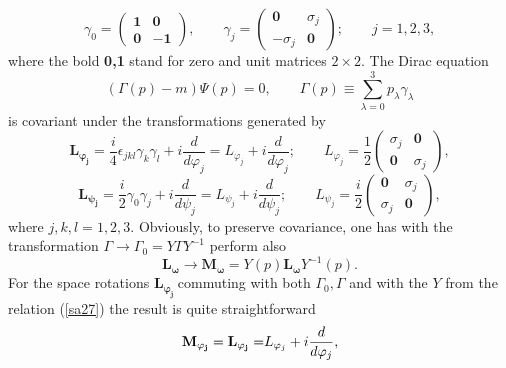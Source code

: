 \documentclass[a4paper,a4paper]{article}
\begin{document}
\begin{equation}
\gamma _{0}=\left( 
\begin{array}{cc}
\mathbf{1} & \mathbf{0} \\ 
\mathbf{0} & \mathbf{-1}%
\end{array}%
\right) ,\qquad \gamma _{j}=\left( 
\begin{array}{cc}
\mathbf{0} & \sigma _{j} \\ 
-\sigma _{j} & \mathbf{0}%
\end{array}%
\right) ;\qquad j=1,2,3,  \label{s41}
\end{equation}%
where the bold \textbf{0,1} stand for zero and unit matrices $2\times 2$.
The Dirac equation 
\begin{equation}
\left( \Gamma (p)-m\right) \Psi (p)=0,\qquad \Gamma (p)\equiv \sum_{\lambda
=0}^{3}p_{\lambda }\gamma _{\lambda }  \label{s42}
\end{equation}%
is covariant under the transformations generated by 
\begin{equation}
\mathbf{L_{\varphi _{j}}=}\frac{i}{4}\epsilon _{jkl}\gamma _{k}\gamma _{l}+i%
\frac{d}{d\varphi _{j}}=L_{\varphi _{j}}+i\frac{d}{d\varphi _{j}};\qquad
L_{\varphi _{j}}=\frac{1}{2}\left( 
\begin{array}{cc}
\sigma _{j} & \mathbf{0} \\ 
\mathbf{0} & \sigma _{j}%
\end{array}%
\right) ,  \label{s43}
\end{equation}%
\begin{equation}
\mathbf{L_{\psi _{j}}=}\frac{i}{2}\gamma _{0}\gamma _{j}+i\frac{d}{d\psi _{j}%
}=L_{\psi _{j}}+i\frac{d}{d\psi _{j}};\qquad L_{\psi _{j}}=\frac{i}{2}\left( 
\begin{array}{cc}
\mathbf{0} & \sigma _{j} \\ 
\sigma _{j} & \mathbf{0}%
\end{array}%
\right) ,  \label{s44}
\end{equation}%
where $j,k,l=1,2,3.$ Obviously, to preserve covariance, one has with the
transformation $\Gamma \rightarrow \Gamma _{0}=Y\Gamma Y^{-1}$ perform also 
\begin{equation}
\mathbf{L_{\omega }\rightarrow M_{\omega }}=Y(p)\mathbf{L_{\omega }}%
Y^{-1}(p).  \label{s45}
\end{equation}%
For the space rotations $\mathbf{L_{\varphi _{j}}\ }$commuting with both $%
\Gamma _{0},\Gamma $ and with the $Y$ from the relation (\ref{sa27}) the
result is quite straightforward 
\begin{equation}
\mathbf{M_{\varphi _{j}}=L_{\varphi _{j}}=}L_{\varphi _{j}}+i\frac{d}{%
d\varphi _{j}},  \label{s46}
\end{equation}%
\end{document}
